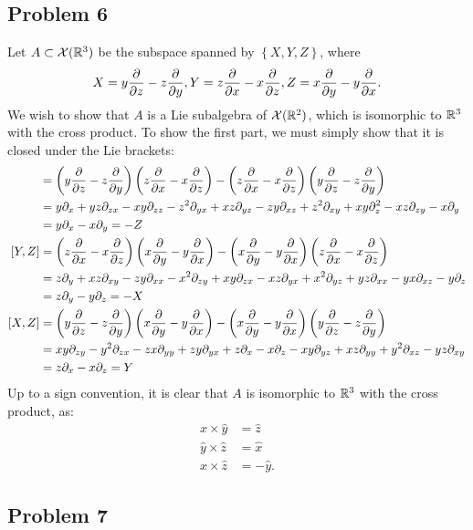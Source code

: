 \documentclass{../../mathnotes}
\begin{document}
\subsection*{Problem 6}

Let $A\subset\mathcal{X}(\mathbb{R}^3)$ be the subspace spanned by $\left\{ X,Y,Z \right\}$, where
\begin{align*}
    X=y\frac{\partial}{\partial z}-z\frac{\partial}{\partial y}, Y=z\frac{\partial}{\partial x}-x\frac{\partial}{\partial z}, Z=x\frac{\partial}{\partial y}-y\frac{\partial}{\partial x}.
\end{align*}
We wish to show that $A$ is a Lie subalgebra of $\mathcal{X}(\mathbb{R}^2)$, which is isomorphic to $\mathbb{R}^3$ with the
cross product. To show the first part, we must simply show that it is closed under the Lie brackets:
\begin{align*}
    [X,Y]&=\left( y\frac{\p}{\p z}-z\frac{\p}{\p y} \right)\left( z\frac{\p}{\p x}-x\frac{\p}{\p z} \right)
    -\left( z\frac{\p}{\p x}-x\frac{\p}{\p z} \right)\left( y\frac{\p}{\p z}-z\frac{\p}{\p y} \right)\\
    &=y\p_x+yz\p_{zx}-xy\p_{zz}-z^2\p_{yx}+xz\p_{yz}
    -zy\p_{xz}+z^2\p_{xy}+xy\p_z^2-xz\p_{zy}-x\p_y\\
    &=y\p_x-x\p_y=-Z\\
    [Y,Z]&=\left( z\frac{\p}{\p x}-x\frac{\p}{\p z} \right)\left( x\frac{\p}{\p y}-y\frac{\p}{\p x} \right)
    -\left( x\frac{\p}{\p y}-y\frac{\p}{\p x} \right)\left( z\frac{\p}{\p x}-x\frac{\p}{\p z} \right)\\
    &=z\p_y+xz\p_{xy}-zy\p_{xx}-x^2\p_{zy}+xy\p_{zx}-xz\p_{yx}+x^2\p_{yz}+yz\p_{xx}-yx\p_{xz}-y\p_z\\
    &=z\p_y-y\p_z=-X\\
    [X,Z]&=\left( y\frac{\p}{\p z}-z\frac{\p}{\p y} \right)\left( x\frac{\p}{\p y}-y\frac{\p}{\p x} \right)
    -\left( x\frac{\p}{\p y}-y\frac{\p}{\p x} \right)\left( y\frac{\p}{\p z}-z\frac{\p}{\p y} \right)\\
    &=xy\p_{zy}-y^2\p_{zx}-zx\p_{yy}+zy\p_{yx}+z\p_x-x\p_z-xy\p_{yz}+xz\p_{yy}+y^2\p_{xz}-yz\p_{xy}\\
    &=z\p_x-x\p_z=Y
\end{align*}
Up to a sign convention, it is clear that $A$ is isomorphic to $\mathbb{R}^3$ with the cross product,
as:
\begin{align*}
    \hat x \times \hat y &= \hat z\\
    \hat y \times \hat z &= \hat x\\
    \hat x \times \hat z &= - \hat y.
\end{align*}

\subsection*{Problem 7}
\end{document}
